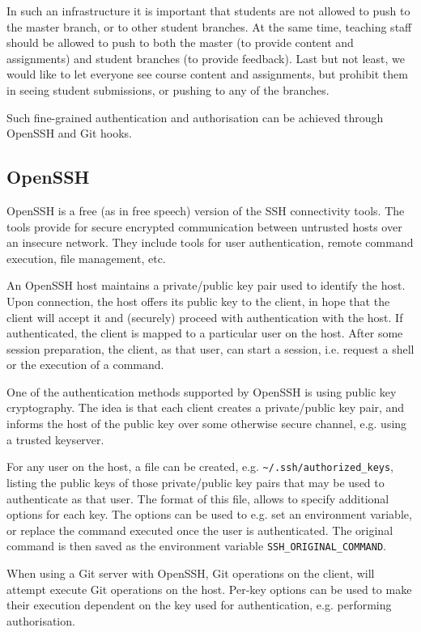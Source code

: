 In such an infrastructure it is important that students are not allowed to push
to the master branch, or to other student branches. At the same time, teaching
staff should be allowed to push to both the master (to provide content and
assignments) and student branches (to provide feedback). Last but not least, we
would like to let everyone see course content and assignments, but prohibit
them in seeing student submissions, or pushing to any of the branches.

Such fine-grained authentication and authorisation can be achieved through
OpenSSH and Git hooks.

\subsection{OpenSSH}

OpenSSH is a free (as in free speech) version of the SSH connectivity
tools\cite{openssh-com-2014}.  The tools provide for secure encrypted
communication between untrusted hosts over an insecure network\cite{man-1-ssh}.
They include tools for user authentication, remote command execution, file
management, etc.

An OpenSSH host maintains a private/public key pair used to identify the host.
Upon connection, the host offers its public key to the client, in hope that the
client will accept it and (securely) proceed with authentication with the host.
If authenticated, the client is mapped to a particular user on the host.  After
some session preparation, the client, as that user, can start a session, i.e.
request a shell or the execution of a command.

One of the authentication methods supported by OpenSSH is using public key
cryptography. The idea is that each client creates a private/public key pair,
and informs the host of the public key over some otherwise secure channel, e.g.
using a trusted keyserver.

For any user on the host, a file can be created, e.g.
\texttt{\textasciitilde/.ssh/authorized\_keys}, listing the public keys of
those private/public key pairs that may be used to authenticate as that user.
The format of this file\cite{man-8-sshd}, allows to specify additional options
for each key. The options can be used to e.g. set an environment variable, or
replace the command executed once the user is authenticated. The original
command is then saved as the environment variable
\texttt{SSH\_ORIGINAL\_COMMAND}.

When using a Git server with OpenSSH, Git operations on the client, will
attempt execute Git operations on the host. Per-key options can be used to make
their execution dependent on the key used for authentication, e.g. performing
authorisation.

